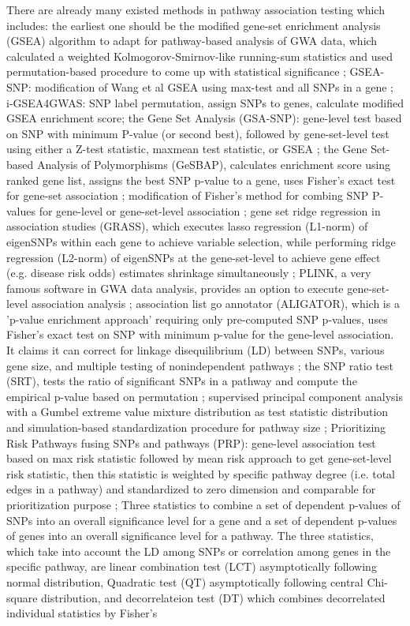 \documentclass[12pt]{article}
\begin{document}
There are already many existed methods in pathway association testing which includes: the earliest one should be the modified gene-set enrichment analysis (GSEA) algorithm to adapt for pathway-based analysis of GWA data, which calculated a weighted Kolmogorov-Smirnov-like running-sum statistics and used permutation-based procedure to come up with statistical significance \cite{wang2007pathway}; GSEA-SNP: modification of Wang et al GSEA \cite{wang2007pathway} using max-test and all SNPs in a gene \cite{Holden2008}; i-GSEA4GWAS: SNP label permutation, assign SNPs to genes, calculate modified GSEA enrichment score\cite{Zhang2010a}; the Gene Set Analysis (GSA-SNP): gene-level test based on SNP with minimum P-value (or second best), followed by gene-set-level test using either a Z-test statistic, maxmean test statistic, or GSEA \cite{Nam2010}; the Gene Set-based Analysis of Polymorphisms (GeSBAP), calculates enrichment score using ranked gene list, assigns the best SNP p-value to a gene, uses Fisher's exact test for gene-set association \cite{Medina2009}; modification of Fisher’s method for combing SNP P-values for gene-level or gene-set-level association \cite{DelaCruz2010}; gene set ridge regression in association studies (GRASS), which executes lasso regression (L1-norm) of eigenSNPs within each gene to achieve variable selection, while performing ridge regression (L2-norm) of eigenSNPs at the gene-set-level to achieve gene effect (e.g. disease risk odds) estimates shrinkage simultaneously \cite{Chen2010}; PLINK, a very famous software in GWA data analysis, provides an option to execute gene-set-level association analysis \cite{Purcell2007}; association list go annotator (ALIGATOR), which is a 'p-value enrichment approach' requiring only pre-computed SNP p-values, uses Fisher's exact test on SNP with minimum p-value for the gene-level association. It claims it can correct for linkage disequilibrium (LD) between SNPs, various gene size, and multiple testing of nonindependent pathways \cite{Holmans2009}; the SNP ratio test (SRT), tests the ratio of significant SNPs in a pathway and compute the empirical p-value based on permutation \cite{ODushlaine2009}; supervised principal component analysis with a Gumbel extreme value mixture distribution as test statistic distribution and simulation-based standardization procedure for pathway size \cite{Chen2010a}; Prioritizing Risk Pathways fusing SNPs and pathways (PRP): gene-level association test based on max risk statistic followed by mean risk approach to get gene-set-level risk statistic, then this statistic is weighted by specific pathway degree (i.e. total edges in a pathway) and standardized to zero dimension and comparable for prioritization purpose \cite{Chen2009}; Three statistics to combine a set of dependent p-values of SNPs into an overall significance level for a gene and a set of dependent p-values of genes into an overall significance level for a pathway. The three statistics, which take into account the LD among SNPs or correlation among genes in the specific pathway, are linear combination test (LCT) asymptotically following normal distribution, Quadratic test (QT) asymptotically following central Chi-square distribution, and decorrelateion test (DT) which combines decorrelated individual statistics by Fisher's 
\end{document}
